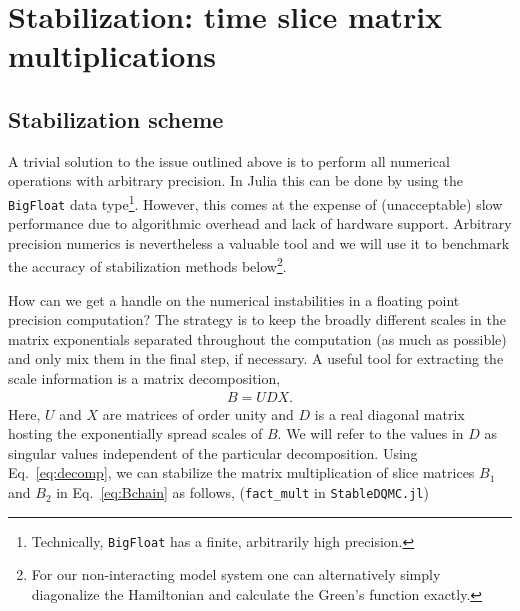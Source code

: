 \documentclass[submission, Phys]{SciPost}
\begin{document}

\section{\label{sec:stabilization}Stabilization: time slice matrix multiplications}

\subsection{Stabilization scheme}
A trivial solution to the issue outlined above is to perform all numerical operations with arbitrary precision. In Julia this can be done by using the \texttt{BigFloat} data type\footnote{Technically, \texttt{BigFloat} has a finite, arbitrarily high precision.}. However, this comes at the expense of (unacceptable) slow performance due to algorithmic overhead and lack of hardware support. Arbitrary precision numerics is nevertheless a valuable tool and we will use it to benchmark the accuracy of stabilization methods below\footnote{For our non-interacting model system one can alternatively simply diagonalize the Hamiltonian and calculate the Green's function exactly.}.


How can we get a handle on the numerical instabilities in a floating point precision computation? The strategy is to keep the broadly different scales in the matrix exponentials separated throughout the computation (as much as possible) and only mix them in the final step, if necessary. A useful tool for extracting the scale information is a matrix decomposition,
\begin{align}
	B = UDX. \label{eq:decomp}
\end{align}
Here, $U$ and $X$ are matrices of order unity and $D$ is a real diagonal matrix hosting the exponentially spread scales of $B$. We will refer to the values in $D$ as singular values independent of the particular decomposition. Using Eq.~\eqref{eq:decomp}, we can stabilize the matrix multiplication of slice matrices $B_1$ and $B_2$ in Eq.~\eqref{eq:Bchain} as follows, (\texttt{fact\_mult} in \texttt{StableDQMC.jl})
\end{document}
